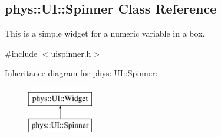 \hypertarget{classphys_1_1UI_1_1Spinner}{
\subsection{phys::UI::Spinner Class Reference}
\label{d7/d81/classphys_1_1UI_1_1Spinner}
}


This is a simple widget for a numeric variable in a box.  




{\ttfamily \#include $<$uispinner.h$>$}

Inheritance diagram for phys::UI::Spinner:\begin{figure}[H]
\begin{center}
\leavevmode
\includegraphics[height=2.000000cm]{d7/d81/classphys_1_1UI_1_1Spinner}
\end{center}
\end{figure}
